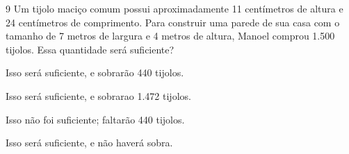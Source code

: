 





\num{9} Um tijolo maciço comum possui aproximadamente 11 centímetros de
altura e 24 centímetros de comprimento. Para construir uma parede de sua
casa com o tamanho de 7 metros de largura e 4 metros de altura, Manoel comprou
1.500 tijolos. Essa quantidade será suficiente?

\begin{escolha}
\item Isso será suficiente, e sobrarão 440 tijolos.
\item Isso será suficiente, e sobrarao 1.472 tijolos.
\item Isso não foi suficiente; faltarão 440 tijolos.
\item Isso será suficiente, e não haverá sobra.
\end{escolha}









